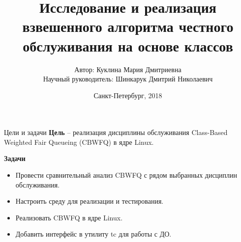 \documentclass[12pt]{beamer}
\title[Исследование и реаализация ДО CBWFQ]{Исследование и реализация взвешенного алгоритма честного обслуживания на основе классов\\}
\author[]{{\small Автор: Куклина Мария Дмитриевна\\ Научный руководитель: Шинкарук Дмитрий Николаевич}}
\institute[]{Университет ИТМО}
\date[]{Санкт-Петербург, 2018}
\begin{document}
\newcommand{\mc}[0]{\makecell}
\newcommand\setrow[1]{\gdef\rowmac{#1}#1\ignorespaces}
\newcommand\clearrow{\global\let\rowmac\relax}
\clearrow

\begin{darkbars}
    \begin{frame}
        \titlepage
    \end{frame}
\end{darkbars}

\begin{frame}{Цели и задачи}
    \textbf{Цель} -- реализация дисциплины обслуживания Class-Based Weighted Fair Queueing
    (CBWFQ) в ядре Linux. \newline
    

    \textbf{Задачи}
    {\small
        \begin{itemize}
            \item Провести сравнительный анализ CBWFQ с рядом выбранных дисциплин обслуживания.
            \item Настроить среду для реализации и тестирования.
            \item Реализовать CBWFQ в ядре Linux.
            \item Добавить интерфейс в утилиту tc для работы с ДО.
        \end{itemize}
    }
\end{frame}

%
%
%
%
%	
%
%
\end{document}
